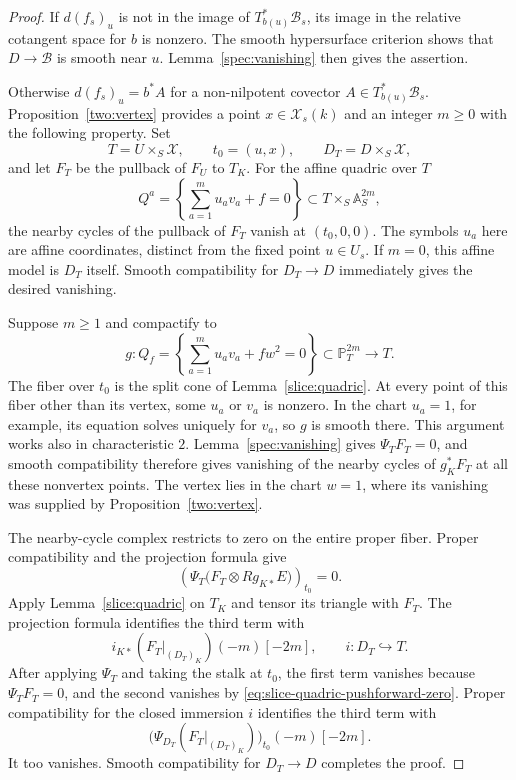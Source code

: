 \begin{proof}
If $d(f_s)_u$ is not in the image of $T^*_{b(u)}\mathcal B_s$, its
image in the relative cotangent space for $b$ is nonzero.  The smooth
hypersurface criterion shows that $D\to\mathcal B$ is smooth near
$u$.  Lemma~\ref{spec:vanishing} then gives the assertion.

Otherwise $d(f_s)_u=b^*A$ for a non-nilpotent covector
$A\in T^*_{b(u)}\mathcal B_s$.  Proposition~\ref{two:vertex}
provides a point $x\in\mathscr X_s(k)$ and an integer $m\geq0$ with
the following property.  Set
\[
 T=U\times_S\mathscr X,\qquad t_0=(u,x),\qquad
 D_T=D\times_S\mathscr X,
\]
and let $F_T$ be the pullback of $F_U$ to $T_K$.  For the affine
quadric over $T$
\[
 Q^a=\left\{\sum_{a=1}^m u_av_a+f=0\right\}
          \subset T\times_S\mathbb A_S^{2m},
\]
the nearby cycles of the pullback of $F_T$ vanish at
$(t_0,0,0)$.  The symbols $u_a$ here are affine coordinates, distinct
from the fixed point $u\in U_s$.
If $m=0$, this affine model is $D_T$ itself.  Smooth compatibility
for $D_T\to D$ immediately gives the desired vanishing.

Suppose $m\geq1$ and compactify to
\[
 g:Q_f=\left\{\sum_{a=1}^m u_av_a+fw^2=0\right\}
          \subset\mathbb P_T^{2m}\longrightarrow T.
\]
The fiber over $t_0$ is the split cone of
Lemma~\ref{slice:quadric}.  At every point of this fiber other than
its vertex, some $u_a$ or $v_a$ is nonzero.  In the chart $u_a=1$,
for example, its equation solves uniquely for $v_a$, so $g$ is
smooth there.  This argument works also in characteristic $2$.
Lemma~\ref{spec:vanishing} gives $\Psi_TF_T=0$, and smooth
compatibility therefore gives vanishing of the nearby cycles of
$g_K^*F_T$ at all these nonvertex points.  The vertex lies in the
chart $w=1$, where its vanishing was supplied by
Proposition~\ref{two:vertex}.

The nearby-cycle complex restricts to zero on the entire proper
fiber.  Proper compatibility and the projection formula give
\begin{equation}\label{eq:slice-quadric-pushforward-zero}
 \left(\Psi_T\bigl(F_T\otimes Rg_{K*}E\bigr)\right)_{t_0}=0.
\end{equation}
Apply Lemma~\ref{slice:quadric} on $T_K$ and tensor its triangle
with $F_T$.  The projection formula identifies the third term with
\[
             i_{K*}(F_T|_{(D_T)_K})(-m)[-2m],
             \qquad i:D_T\hookrightarrow T.
\]
After applying $\Psi_T$ and taking the stalk at $t_0$, the first
term vanishes because $\Psi_TF_T=0$, and the second vanishes by
\eqref{eq:slice-quadric-pushforward-zero}.  Proper compatibility for
the closed immersion $i$ identifies the third term with
\[
             \bigl(\Psi_{D_T}(F_T|_{(D_T)_K})\bigr)_{t_0}
                        (-m)[-2m].
\]
It too vanishes.  Smooth compatibility for $D_T\to D$ completes
the proof.
\end{proof}

